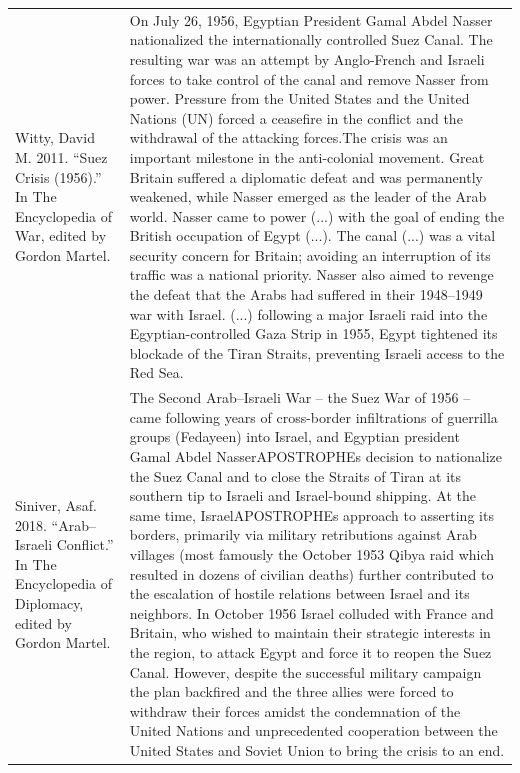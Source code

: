 {\begin{longtable}{p{}p{}}
\\
Witty, David M. 2011. “Suez Crisis (1956).” In The Encyclopedia of War, edited by Gordon Martel. & On July 26, 1956, Egyptian President Gamal Abdel Nasser nationalized the internationally controlled Suez Canal. The resulting war was an attempt by Anglo-French and Israeli forces to take control of the canal and remove Nasser from power. Pressure from the United States and the United Nations (UN) forced a ceasefire in the conflict and the withdrawal of the attacking forces.The crisis was an important milestone in the anti-colonial movement. Great Britain suffered a diplomatic defeat and was permanently weakened, while Nasser emerged as the leader of the Arab world. Nasser came to power (...) with the goal of ending the British occupation of Egypt (...). The canal (...) was a vital security concern for Britain; avoiding an interruption of its traffic was a national priority. Nasser also aimed to revenge the defeat that the Arabs had suffered in their 1948–1949 war with Israel. (...) following a major Israeli raid into the Egyptian-controlled Gaza Strip in 1955, Egypt tightened its blockade of the Tiran Straits, preventing Israeli access to the Red Sea.
\\
Siniver, Asaf. 2018. “Arab–Israeli Conflict.” In The Encyclopedia of Diplomacy, edited by Gordon Martel. & The Second Arab–Israeli War – the Suez War of 1956 – came following years of cross-border infiltrations of guerrilla groups (Fedayeen) into Israel, and Egyptian president Gamal Abdel NasserAPOSTROPHEs decision to nationalize the Suez Canal and to close the Straits of Tiran at its southern tip to Israeli and Israel-bound shipping. At the same time, IsraelAPOSTROPHEs approach to asserting its borders, primarily via military retributions against Arab villages (most famously the October 1953 Qibya raid which resulted in dozens of civilian deaths) further contributed to the escalation of hostile relations between Israel and its neighbors. In October 1956 Israel colluded with France and Britain, who wished to maintain their strategic interests in the region, to attack Egypt and force it to reopen the Suez Canal. However, despite the successful military campaign the plan backfired and the three allies were forced to withdraw their forces amidst the condemnation of the United Nations and unprecedented cooperation between the United States and Soviet Union to bring the crisis to an end. 
\\

\end{longtable}}
